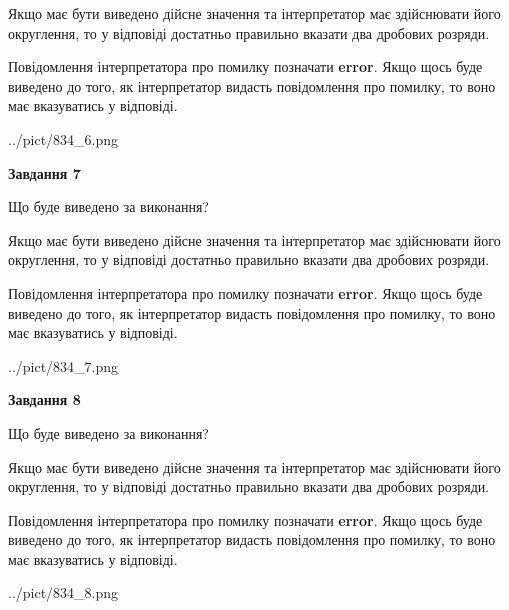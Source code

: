 \documentclass[12pt, ukrainian]{article}
\begin{document}
{\begin {Large}
Якщо має бути виведено дійсне значення та інтерпретатор має здійснювати його округлення, 
то у відповіді достатньо правильно вказати два дробових розряди.

Повідомлення інтерпретатора про помилку позначати \textbf{error}.
Якщо щось буде виведено до того, як інтерпретатор видасть повідомлення про помилку, 
то воно має вказуватись у відповіді. \par

\begin{center}
	{../pict/834_6.png}
\end{center}
\newpage

{\begin {center}\textbf{Завдання 7}\end {center}}\par
Що буде виведено за виконання? \par

Якщо має бути виведено дійсне значення та інтерпретатор має здійснювати його округлення, 
то у відповіді достатньо правильно вказати два дробових розряди.

Повідомлення інтерпретатора про помилку позначати \textbf{error}.
Якщо щось буде виведено до того, як інтерпретатор видасть повідомлення про помилку, 
то воно має вказуватись у відповіді. \par

\begin{center}
	{../pict/834_7.png}
\end{center}
\newpage

{\begin {center}\textbf{Завдання 8}\end {center}}\par
Що буде виведено за виконання? \par

Якщо має бути виведено дійсне значення та інтерпретатор має здійснювати його округлення, 
то у відповіді достатньо правильно вказати два дробових розряди.

Повідомлення інтерпретатора про помилку позначати \textbf{error}.
Якщо щось буде виведено до того, як інтерпретатор видасть повідомлення про помилку, 
то воно має вказуватись у відповіді. \par

\begin{center}
	{../pict/834_8.png}
\end{center}
\newpage


\end{Large}}
\end{document}
